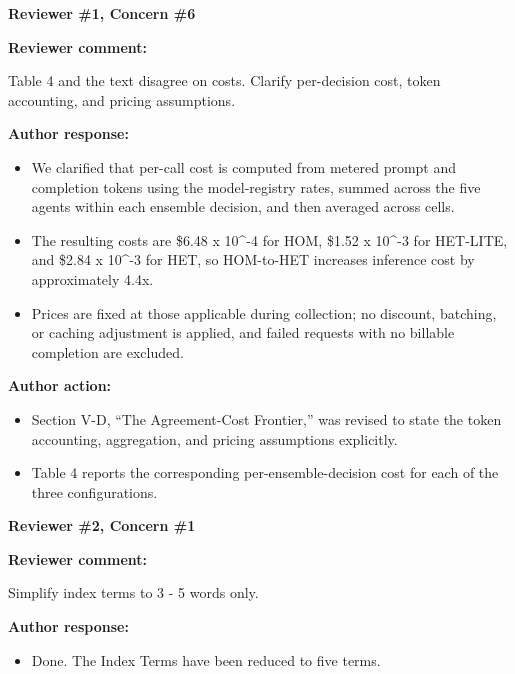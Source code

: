 \documentclass[11pt]{article}
\newcommand{\rvcomment}[1]{{\color{ReviewerGreen}#1}}
\newcommand{\concern}[1]{\textbf{\color{ReviewerGreen}#1}}
\begin{document}
\vspace{12pt}
\concern{Reviewer \#1, Concern \#6}

\concern{Reviewer comment:}

\rvcomment{Table 4 and the text disagree on costs. Clarify per-decision cost, token accounting, and pricing assumptions.}

\textbf{Author response:}

\begin{itemize}

\item We clarified that per-call cost is computed from metered prompt and completion tokens using the model-registry rates, summed across the five agents within each ensemble decision, and then averaged across cells.

\item The resulting costs are \$6.48 x 10\textasciicircum{}-4 for HOM, \$1.52 x 10\textasciicircum{}-3 for HET-LITE, and \$2.84 x 10\textasciicircum{}-3 for HET, so HOM-to-HET increases inference cost by approximately 4.4x.

\item Prices are fixed at those applicable during collection; no discount, batching, or caching adjustment is applied, and failed requests with no billable completion are excluded.

\end{itemize}

\textbf{Author action:}

\begin{itemize}

\item Section V-D, ``The Agreement-Cost Frontier,'' was revised to state the token accounting, aggregation, and pricing assumptions explicitly.

\item Table 4 reports the corresponding per-ensemble-decision cost for each of the three configurations.

\end{itemize}

\vspace{12pt}
\concern{Reviewer \#2, Concern \#1}

\concern{Reviewer comment:}

\rvcomment{Simplify index terms to 3 - 5 words only.}

\textbf{Author response:}

\begin{itemize}

\item Done. The Index Terms have been reduced to five terms.

\end{itemize}
\end{document}
